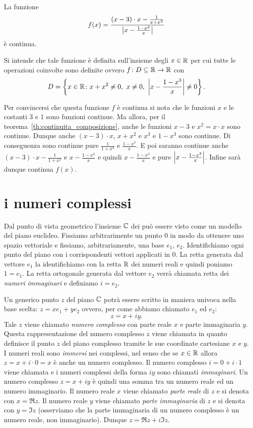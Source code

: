 \begin{example}
La funzione
\[
f(x) = \frac{(x-3)\cdot x -\frac{1}{x+x^2}}{{\left|x-\frac{1-x^3}{x}\right|}}
\]
è continua.

Si intende che tale funzione è definita sull'insieme degli $x\in \mathbb R$
per cui tutte le operazioni coinvolte sono definite ovvero
$f\colon D \subseteq \mathbb R \to \mathbb R$
con
\[
  D = \left\{x\in \RR \colon x+x^2 \neq 0,\ x\neq 0,\ \abs{x-\frac{1-x^3}{x}}\neq 0\right\}.
\]

Per convincersi che questa funzione $f$ è continua
si nota che le funzioni $x$ e le costanti $3$ e $1$ sono
funzioni continue.
Ma allora, per il teorema~\ref{th:continuita_composizione},
anche le funzioni $x-3$ e $x^2=x\cdot x$ sono continue.
Dunque anche $(x-3)\cdot x$, $x+x^2$ e $x^3$ e $1-x^3$ sono continue.
Di conseguenza sono continue pure $\frac 1{1+x^2}$ e $\frac{1-x^3}{x}$.
E poi saranno continue anche $(x-3)\cdot x - \frac 1{1+x^2}$ e $x-\frac{1-x^3}{x}$
e quindi $x-\frac{1-x^3}{x}$ e pure ${\left|x-\frac{1-x^3}{x}\right|}$. Infine sarà
dunque continua $f(x)$.
\end{example}

\section{i numeri complessi}

Dal punto di vista geometrico l'insieme $\CC$ dei 
\index{$\CC$}
può essere visto come un modello del piano euclideo.
Fissiamo arbitrarimente un punto $0$ in modo da ottenere uno spazio
vettoriale e fissiamo, arbitrariamente, una base $e_1$, $e_2$.
Identifichiamo ogni punto del piano con i corrispondenti vettori
applicati in $0$. La retta generata dal vettore $e_1$ la identifichiamo
con la retta $\mathbb R$ dei numeri reali e quindi poniamo $1=e_1$.
La retta ortogonale generata dal vettore $e_2$ verrà chiamata
retta dei \emph{numeri immaginari} e definiamo $i=e_2$.

Un generico punto $z$ del piano $\CC$ potrà essere scritto in
maniera univoca nella base scelta: $z = x e_1 + y e_2$ ovvero,
per come abbiamo chiamato $e_1$ ed $e_2$:
\[
z = x + i y.
\]
Tale $z$ viene chiamato
\emph{numero complesso} con parte reale $x$ e parte immaginaria $y$.
Questa rappresentazione del numero complesso $z$ viene
chiamata  in quanto definisce
il punto $z$ del piano complesso tramite le sue coordinate cartesiane
$x$ e $y$.
I numeri reali sono \emph{immersi} nei complessi, nel senso che se
$x\in \mathbb R$ allora $z= x + i\cdot 0 = x$ è anche un numero complesso.
Il numero complesso $i = 0 + i\cdot 1$ viene chiamata 
e i numeri complessi della forma $iy$ sono chiamati \emph{immaginari}.
Un numero
complesso $z = x+iy$ è quindi una somma tra un numero reale ed un numero
immaginario. Il numero reale $x$ viene chiamato \emph{parte reale}
di $z$ e
si denota con $x=\Re z$.
Il numero reale $y$ viene chiamato
\emph{parte immaginaria}
di $z$ e si denota con $y=\Im z$
(osserviamo che la parte immaginaria di un numero complesso è un numero
reale, non immaginario). Dunque $z= \Re z + i \Im z$.

